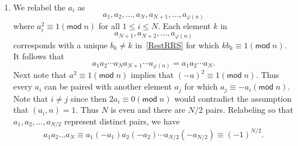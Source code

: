 \documentclass[12pt]{article}
\renewcommand{\pmod}[1]{\left(\mathsf{mod}\;#1\right)}
\begin{document}
\begin{enumerate}
\item %
We relabel the $a_i$ as
\[a_1,a_2,\ldots,a_N,a_{N+1},\ldots,a_{\varphi\left(n\right)}\]
where $a_i^2\equiv 1\pmod{n}$ for all $1\le i\le N$.
Each element $k$ in
\begin{equation}\label{RestRRS}
a_{N+1},a_{N+2},\ldots,a_{\varphi\left(n\right)}
\end{equation}
corresponds with a unique $b_k\ne k$ in~\autoref{RestRRS}
for which $kb_k\equiv 1\pmod{n}$. It follows that
\[a_1a_2\cdots a_Na_{N+1}\cdots a_{\varphi\left(n\right)}
=a_1a_2\cdots a_N.\]
Next note that $a^2\equiv 1\pmod{n}$ implies that
$\left(-a\right)^2\equiv 1\pmod{n}$.
Thus every $a_i$ can be paired with another element
$a_j$ for which $a_j\equiv -a_i\pmod{n}$.
Note that $i\ne j$ since then $2a_i\equiv 0\pmod{n}$
would contradict the assumption that $\left(a_i,n\right)=1$.
Thus $N$ is even and there are $N/2$ pairs.
Relabeling so that $a_1,a_2,\ldots,a_{N/2}$ represent
distinct pairs, we have
\begin{equation*}
a_1a_2\ldots a_N
\equiv a_1\left(-a_1\right)a_2\left(-a_2\right)
\cdots a_{N/2}\left(-a_{N/2}\right)\equiv \left(-1\right)^{N/2}.
\end{equation*}
\end{enumerate}
\end{document}
